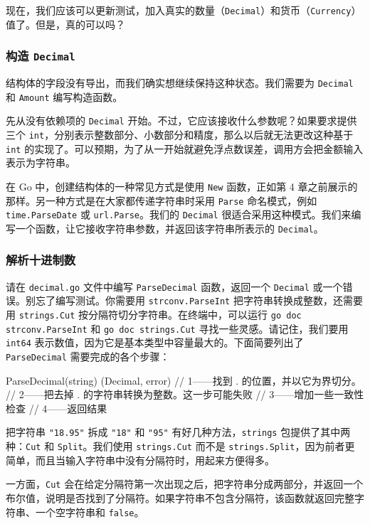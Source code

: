 现在，我们应该可以更新测试，加入真实的数量（\texttt{Decimal}）和货币（\texttt{Currency}）值了。但是，真的可以吗？

\subsubsection*{构造 \texttt{Decimal}}

结构体的字段没有导出，而我们确实想继续保持这种状态。我们需要为 \texttt{Decimal} 和 \texttt{Amount} 编写构造函数。

先从没有依赖项的 \texttt{Decimal} 开始。不过，它应该接收什么参数呢？如果要求提供三个 \texttt{int}，分别表示整数部分、小数部分和精度，那么以后就无法更改这种基于 \texttt{int} 的实现了。可以预期，为了从一开始就避免浮点数误差，调用方会把金额输入表示为字符串。

在 Go 中，创建结构体的一种常见方式是使用 \texttt{New} 函数，正如第 4 章之前展示的那样。另一种方式是在大家都传递字符串时采用 \texttt{Parse} 命名模式，例如 \texttt{time.ParseDate} 或 \texttt{url.Parse}。我们的 \texttt{Decimal} 很适合采用这种模式。我们来编写一个函数，让它接收字符串参数，并返回该字符串所表示的 \texttt{Decimal}。

\subsubsection*{解析十进制数}

请在 \texttt{decimal.go} 文件中编写 \texttt{ParseDecimal} 函数，返回一个 \texttt{Decimal} 或一个错误。别忘了编写测试。你需要用 \texttt{strconv.ParseInt} 把字符串转换成整数，还需要用 \texttt{strings.Cut} 按分隔符切分字符串。在终端中，可以运行 \texttt{go doc strconv.ParseInt} 和 \texttt{go doc strings.Cut} 寻找一些灵感。请记住，我们要用 \texttt{int64} 表示数值，因为它是基本类型中容量最大的。下面简要列出了 \texttt{ParseDecimal} 需要完成的各个步骤：

\begin{gocode}[]
ParseDecimal(string) (Decimal, error)
// 1——找到 . 的位置，并以它为界切分。
// 2——把去掉 . 的字符串转换为整数。这一步可能失败
// 3——增加一些一致性检查
// 4——返回结果
\end{gocode}

把字符串 \texttt{"18.95"} 拆成 \texttt{"18"} 和 \texttt{"95"} 有好几种方法，\texttt{strings} 包提供了其中两种：\texttt{Cut} 和 \texttt{Split}。我们使用 \texttt{strings.Cut} 而不是 \texttt{strings.Split}，因为前者更简单，而且当输入字符串中没有分隔符时，用起来方便得多。

一方面，\texttt{Cut} 会在给定分隔符第一次出现之后，把字符串分成两部分，并返回一个布尔值，说明是否找到了分隔符。如果字符串不包含分隔符，该函数就返回完整字符串、一个空字符串和 \texttt{false}。

